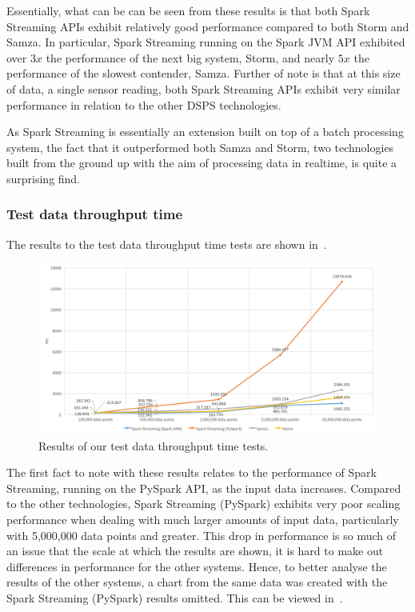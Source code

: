 Essentially, what can be can be seen from these results is that both Spark Streaming APIs exhibit relatively good performance
compared to both Storm and Samza. In particular, Spark Streaming running on the Spark JVM API exhibited over $3x$ the
performance of the next big system, Storm, and nearly $5x$ the performance of the slowest contender, Samza. Further of
note is that at this size of data, a single sensor reading, both Spark Streaming APIs exhibit very similar performance
in relation to the other DSPS technologies.

As Spark Streaming is essentially an extension built on top of a batch processing system, the fact that it outperformed
both Samza and Storm, two technologies built from the ground up with the aim of processing data in realtime, is quite a
surprising find.

\subsubsection{Test data throughput time}

The results to the test data throughput time tests are shown in~.

\begin{figure}[H]
  \centering
  \includegraphics[width=1\textwidth]{includes/figures/fig_throughput_res}
  \caption{Results of our test data throughput time tests.}
  \label{fig:throughput_time_res}
\end{figure}

The first fact to note with these results relates to the performance of Spark Streaming, running on the PySpark API, as the
input data increases. Compared to the other technologies, Spark Streaming (PySpark) exhibits very poor scaling performance
when dealing with much larger amounts of input data, particularly with 5,\@000,\@000 data points and greater. This drop in
performance is so much of an issue that the scale at which the results are shown, it is hard to make out differences in
performance for the other systems. Hence, to better analyse the results of the other systems, a chart from the same
data was created with the Spark Streaming (PySpark) results omitted. This can be viewed in~.

